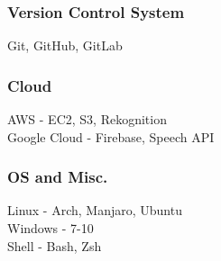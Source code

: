 \subsubsection*{Version Control System}
Git, GitHub, GitLab \\

\subsubsection*{Cloud}
AWS - {EC2, S3, Rekognition} \\
Google Cloud - Firebase, Speech API \\

\subsubsection*{OS and Misc.}
Linux - {Arch, Manjaro, Ubuntu} \\
Windows - {7-10} \\
Shell - {Bash, Zsh} \\

\sectionspace %
